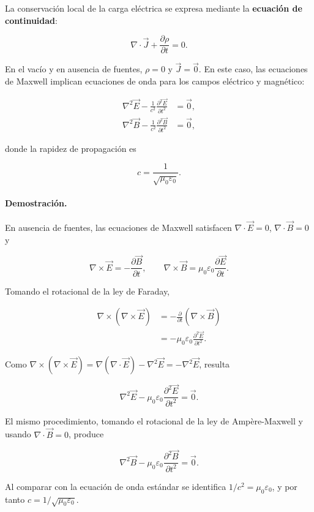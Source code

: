 La conservación local de la carga eléctrica se expresa mediante la \textbf{ecuación de continuidad}:

\[
    \nabla\cdot\vec{J}+\frac{\partial\rho}{\partial t}=0.
\]

En el vacío y en ausencia de fuentes, $\rho=0$ y $\vec{J}=\vec{0}$. En este caso, las ecuaciones de Maxwell implican ecuaciones de onda para los campos eléctrico y magnético:

\begin{align*}
    \nabla^2\vec{E}
    -\frac{1}{c^2}\frac{\partial^2\vec{E}}{\partial t^2}
    &=\vec{0}, \\
    \nabla^2\vec{B}
    -\frac{1}{c^2}\frac{\partial^2\vec{B}}{\partial t^2}
    &=\vec{0},
\end{align*}

donde la rapidez de propagación es

\[
    c=\frac{1}{\sqrt{\mu_0\varepsilon_0}}.
\]

\paragraph{Demostración.}
En ausencia de fuentes, las ecuaciones de Maxwell satisfacen $\nabla\cdot\vec{E}=0$, $\nabla\cdot\vec{B}=0$ y

\[
    \nabla\times\vec{E}=-\frac{\partial\vec{B}}{\partial t},
    \qquad
    \nabla\times\vec{B}=\mu_0\varepsilon_0
    \frac{\partial\vec{E}}{\partial t}.
\]

Tomando el rotacional de la ley de Faraday,

\begin{align*}
    \nabla\times(\nabla\times\vec{E})
    &=-\frac{\partial}{\partial t}(\nabla\times\vec{B}) \\
    &=-\mu_0\varepsilon_0\frac{\partial^2\vec{E}}{\partial t^2}.
\end{align*}

Como $\nabla\times(\nabla\times\vec{E})=\nabla(\nabla\cdot\vec{E})-\nabla^2\vec{E}=-\nabla^2\vec{E}$, resulta

\[
    \nabla^2\vec{E}
    -\mu_0\varepsilon_0\frac{\partial^2\vec{E}}{\partial t^2}
    =\vec{0}.
\]

El mismo procedimiento, tomando el rotacional de la ley de Ampère-Maxwell y usando $\nabla\cdot\vec{B}=0$, produce

\[
    \nabla^2\vec{B}
    -\mu_0\varepsilon_0\frac{\partial^2\vec{B}}{\partial t^2}
    =\vec{0}.
\]

Al comparar con la ecuación de onda estándar se identifica $1/c^2=\mu_0\varepsilon_0$, y por tanto $c=1/\sqrt{\mu_0\varepsilon_0}$.

